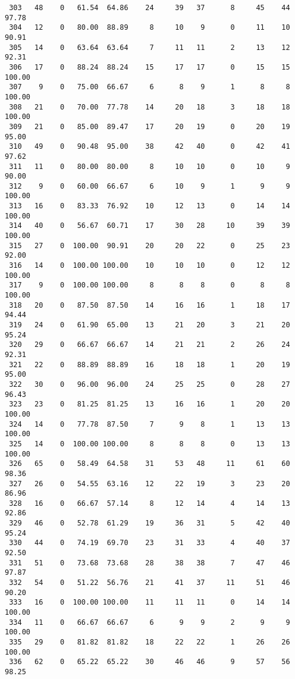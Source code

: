 \begin{verbatim}
 303   48    0   61.54  64.86    24     39   37      8     45    44    97.78
 304   12    0   80.00  88.89     8     10    9      0     11    10    90.91
 305   14    0   63.64  63.64     7     11   11      2     13    12    92.31
 306   17    0   88.24  88.24    15     17   17      0     15    15   100.00
 307    9    0   75.00  66.67     6      8    9      1      8     8   100.00
 308   21    0   70.00  77.78    14     20   18      3     18    18   100.00
 309   21    0   85.00  89.47    17     20   19      0     20    19    95.00
 310   49    0   90.48  95.00    38     42   40      0     42    41    97.62
 311   11    0   80.00  80.00     8     10   10      0     10     9    90.00
 312    9    0   60.00  66.67     6     10    9      1      9     9   100.00
 313   16    0   83.33  76.92    10     12   13      0     14    14   100.00
 314   40    0   56.67  60.71    17     30   28     10     39    39   100.00
 315   27    0  100.00  90.91    20     20   22      0     25    23    92.00
 316   14    0  100.00 100.00    10     10   10      0     12    12   100.00
 317    9    0  100.00 100.00     8      8    8      0      8     8   100.00
 318   20    0   87.50  87.50    14     16   16      1     18    17    94.44
 319   24    0   61.90  65.00    13     21   20      3     21    20    95.24
 320   29    0   66.67  66.67    14     21   21      2     26    24    92.31
 321   22    0   88.89  88.89    16     18   18      1     20    19    95.00
 322   30    0   96.00  96.00    24     25   25      0     28    27    96.43
 323   23    0   81.25  81.25    13     16   16      1     20    20   100.00
 324   14    0   77.78  87.50     7      9    8      1     13    13   100.00
 325   14    0  100.00 100.00     8      8    8      0     13    13   100.00
 326   65    0   58.49  64.58    31     53   48     11     61    60    98.36
 327   26    0   54.55  63.16    12     22   19      3     23    20    86.96
 328   16    0   66.67  57.14     8     12   14      4     14    13    92.86
 329   46    0   52.78  61.29    19     36   31      5     42    40    95.24
 330   44    0   74.19  69.70    23     31   33      4     40    37    92.50
 331   51    0   73.68  73.68    28     38   38      7     47    46    97.87
 332   54    0   51.22  56.76    21     41   37     11     51    46    90.20
 333   16    0  100.00 100.00    11     11   11      0     14    14   100.00
 334   11    0   66.67  66.67     6      9    9      2      9     9   100.00
 335   29    0   81.82  81.82    18     22   22      1     26    26   100.00
 336   62    0   65.22  65.22    30     46   46      9     57    56    98.25

\end{verbatim}
